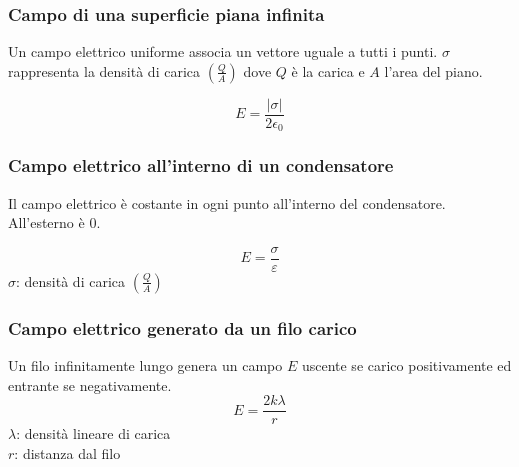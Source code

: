 \subsubsection{Campo di una superficie piana infinita}
Un campo elettrico uniforme associa un vettore uguale a tutti i punti. $\sigma$ rappresenta la 
densità di carica $\left(\frac{Q}{A}\right)$ dove $Q$ è la carica e $A$ l'area del piano.
\begin{center}
\end{center}
\begin{equation*}
  E = \frac{\left\lvert\sigma\right\rvert}{2\epsilon_0}
\end{equation*}

\subsubsection{Campo elettrico all'interno di un condensatore}
Il campo elettrico è costante in ogni punto all'interno del condensatore. All'esterno è $0$.
\begin{center}
\end{center}
\begin{equation*}
  E = \frac{\sigma}{\varepsilon}
\end{equation*}
$\sigma$: densità di carica $\left(\frac{Q}{A}\right)$

\subsubsection{Campo elettrico generato da un filo carico}
Un filo infinitamente lungo genera un campo $E$ uscente se carico positivamente ed entrante se
negativamente.
\begin{equation*}
  E = \frac{2k\lambda}{r}
\end{equation*}
$\lambda$: densità lineare di carica\\
$r$: distanza dal filo


